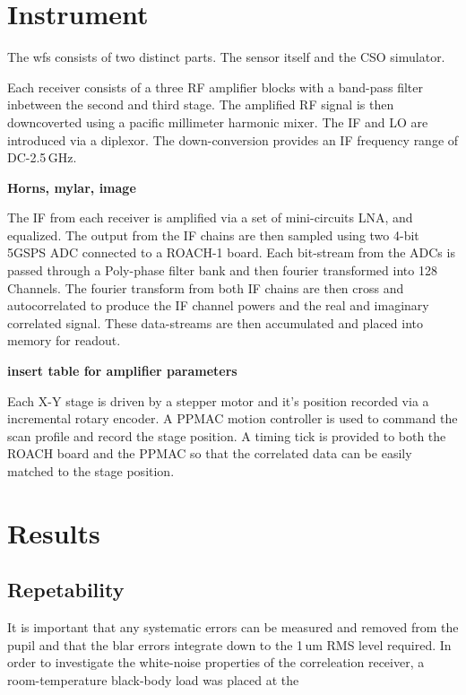 \documentclass[osajnl,twocolumn,showpacs,superscriptaddress,11pt]{revtex4-1} %
\begin{document}
\section{Instrument}

The wfs consists of two distinct parts. The sensor itself and the CSO simulator.

Each receiver consists of a three RF amplifier blocks with a band-pass filter inbetween the second and third stage. The amplified RF signal is then downcoverted using a pacific millimeter harmonic mixer. The IF and LO are introduced via a diplexor.  The down-conversion provides an IF frequency range of DC-2.5\,GHz.

{\bf Horns, mylar, image}

The IF from each receiver is amplified via a set of mini-circuits LNA, and equalized.  The output from the IF chains are then sampled using two 4-bit 5GSPS ADC connected to a ROACH-1 board.  Each bit-stream from the ADCs is passed through a Poly-phase filter bank and then fourier transformed into 128 Channels.  The fourier transform from both IF chains are then cross and autocorrelated to produce the IF channel powers and the real and imaginary correlated signal.    These data-streams are then accumulated and placed into memory for readout.  

{\bf insert table for amplifier parameters}

Each X-Y stage is driven by a stepper motor and it's position recorded via a incremental rotary encoder.  A PPMAC motion controller is used to command the scan profile and record the stage position.  A timing tick is provided to both the ROACH board and the PPMAC so that the correlated data can be easily matched to the stage position.

\section{Results}

\subsection{Repetability}

It is important that any systematic errors can be measured and removed from the pupil and that the blar errors integrate down to the 1\,um RMS level required. In order to investigate the white-noise properties of the correleation receiver, a room-temperature black-body load was placed at the 
\end{document}
